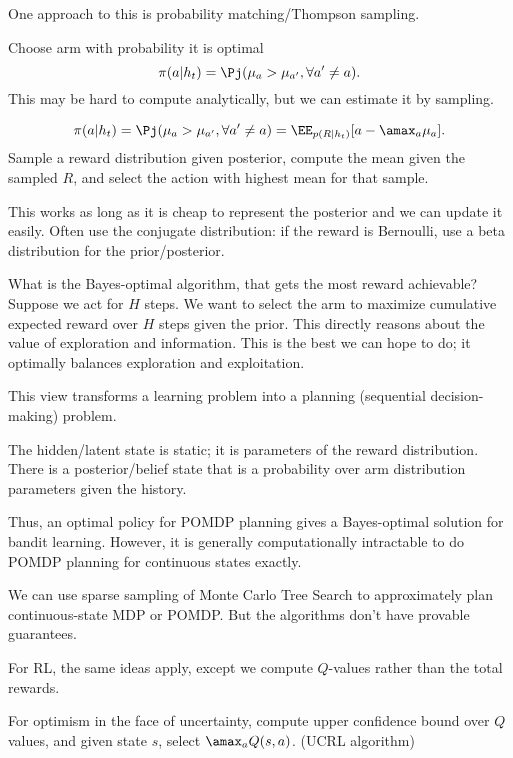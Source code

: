 One approach to this is probability matching/Thompson sampling. 

Choose arm with probability it is optimal
$$
\pi(a|h_t) = \Pj(\mu_a>\mu_{a'}, \forall a'\ne a).
$$
This may be hard to compute analytically, but we can estimate it by sampling. 
\begin{alg}
$$
\pi(a|h_t) = \Pj(\mu_a>\mu_{a'}, \forall a'\ne a) = \EE_{p(R|h_t)} [a-\amax_a\mu_a].
$$
Sample a reward distribution given posterior, compute the mean given the sampled $R$, and select the action with highest mean for that sample.
\end{alg}
This works as long as it is cheap to represent the posterior and we can update it easily.
Often use the conjugate distribution: if the reward is Bernoulli, use a beta distribution for the prior/posterior. 

What is the Bayes-optimal algorithm, that gets the most reward achievable? %
Suppose we act for $H$ steps. We want to select the arm to maximize cumulative expected reward over $H$ steps given the prior. This directly reasons about the value of exploration and information. This is the best we can hope to do; it optimally balances exploration and exploitation.

This view transforms a learning problem into a planning (sequential decision-making) problem.

The hidden/latent state is static; it is parameters of the reward distribution. There is a posterior/belief state that is a probability over arm distribution parameters given the history.

Thus, an optimal policy for POMDP planning gives a Bayes-optimal solution for bandit learning. However, it is generally computationally intractable to do POMDP planning for continuous states exactly.

We can use sparse sampling of Monte Carlo Tree Search to approximately plan continuous-state MDP or POMDP. But the algorithms don't have provable guarantees.

For RL, the same ideas apply, except we compute $Q$-values rather than the total rewards.

For optimism in the face of uncertainty, compute upper confidence bound over $Q$ values, and given state $s$, select $\amax_a Q(s,a)$. (UCRL algorithm)

